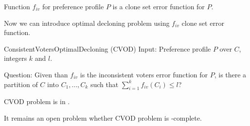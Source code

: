 \begin{rmrk}
Function $f_{iv}$ for preference profile $P$ is a clone set error function for $P$.
\end{rmrk}

Now we can introduce optimal decloning problem using $f_{iv}$ clone set error function.

\begin{problem}{ConsistentVotersOptimalDecloning (CVOD)}
	Input: Preference profile $P$ over $C$, integers $k$ and $l$.

	Question: Given than $f_{iv}$ is the inconsistent voters error function for $P$,
		is there a partition of $C$ into $C_1, ..., C_k$ such that $\sum_{i=1}^k f_{iv}(C_i) \leq l$?
\end{problem}

\begin{rmrk}
\textsc{CVOD} problem is in \np.
\end{rmrk}

It remains an open problem whether \textsc{CVOD} problem is \np-complete.
